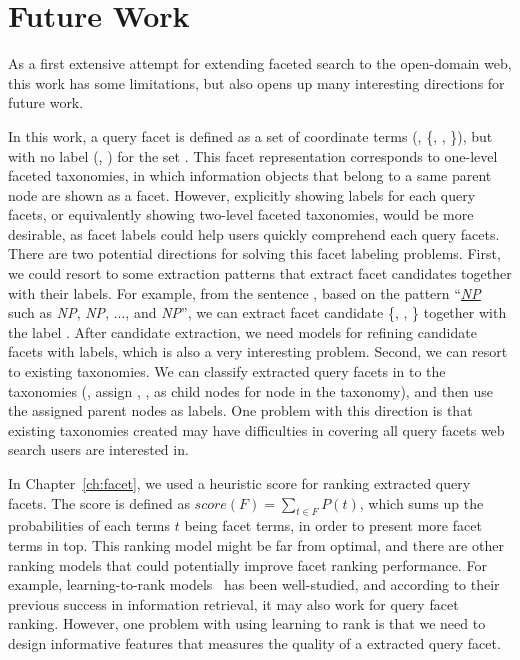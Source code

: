 \section{Future Work}
As a first extensive attempt for extending faceted search to the open-domain web, this work has some limitations, but also opens up many interesting directions for future work.


In this work, a query facet is defined as a set of coordinate terms (\eg, \{, , \}), but with no label (\eg, ) for the set . This facet representation corresponds to one-level faceted taxonomies, in which information objects that belong to a same parent node are shown as a facet. However, explicitly showing labels for each query facets, or equivalently showing two-level faceted taxonomies, would be more desirable, as facet labels could help users quickly comprehend each query facets. There are two potential directions for solving this facet labeling problems. First, we could resort to some extraction patterns that extract facet candidates together with their labels.
For example, from the sentence , based on the pattern ``\textit{\underline{NP}} such as \textit{NP}, \textit{NP}, ..., and \textit{NP}'', we can extract facet candidate \{, , \} together with the label . After candidate extraction, we need models for refining candidate facets with labels, which is also a very interesting problem. Second, we can resort to existing taxonomies. We can classify extracted query facets in to the taxonomies (\eg, assign , ,  as child nodes for node  in the taxonomy), and then use the assigned parent nodes as labels. One problem with this direction is that existing taxonomies created may have difficulties in covering all query facets web search users are interested in. 

In Chapter~\ref{ch:facet}, we used a heuristic score for ranking extracted query facets. The score is defined as $score(F)=\sum_{t \in F}{P(t)}$, which sums up the probabilities of each terms $t$ being facet terms, in order to present more facet terms in top. This ranking model might be far from optimal, and there are other ranking models that could potentially improve facet ranking performance. For example, learning-to-rank models~\cite{liu2009learning} has been well-studied, and according to their previous success in information retrieval, it may also work for query facet ranking. However, one problem with using learning to rank is that we need to design informative features that measures the quality of a extracted query facet.

